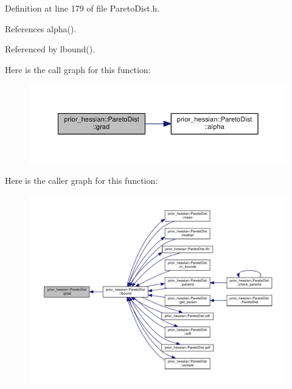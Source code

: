 Definition at line 179 of file Pareto\+Dist.\+h.



References alpha().



Referenced by lbound().



Here is the call graph for this function\+:\nopagebreak
\begin{figure}[H]
\begin{center}
\leavevmode
\includegraphics[width=350pt]{classprior__hessian_1_1ParetoDist_a3f802550dfcad6f0e3a8ca2e93709fe9_cgraph}
\end{center}
\end{figure}




Here is the caller graph for this function\+:\nopagebreak
\begin{figure}[H]
\begin{center}
\leavevmode
\includegraphics[width=350pt]{classprior__hessian_1_1ParetoDist_a3f802550dfcad6f0e3a8ca2e93709fe9_icgraph}
\end{center}
\end{figure}


